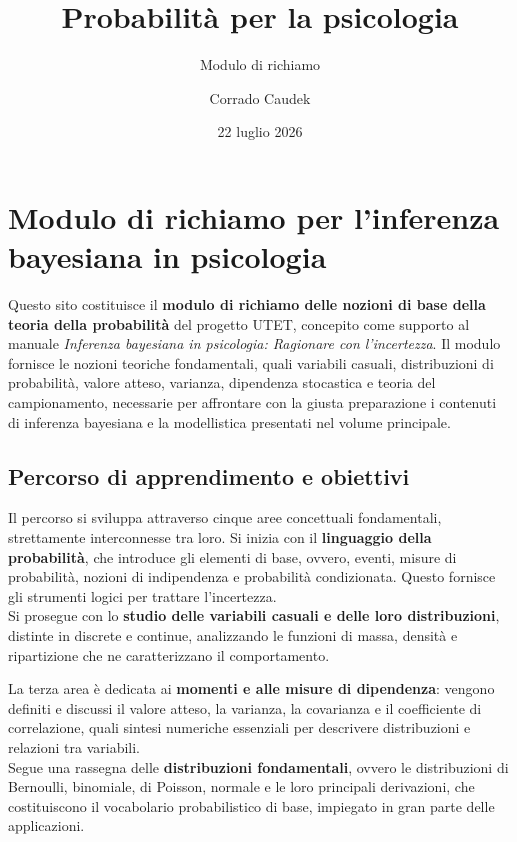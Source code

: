 \documentclass[
  italian,
  letterpaper,
  a4paper,
  11pt,
  open=any]{scrbook}
\title{Probabilità per la psicologia}
\subtitle{Modulo di richiamo}
\author{Corrado Caudek}
\date{22 luglio 2026}
\theoremstyle{plain}
\theoremstyle{definition}
\theoremstyle{definition}
\theoremstyle{remark}
\begin{document}
\frontmatter
\maketitle


\mainmatter
{}

\chapter*{Modulo di richiamo per l'inferenza bayesiana in
psicologia}\label{modulo-di-richiamo-per-linferenza-bayesiana-in-psicologia}


Questo sito costituisce il \textbf{modulo di richiamo delle nozioni di
base della teoria della probabilità} del progetto UTET, concepito come
supporto al manuale \emph{Inferenza bayesiana in psicologia: Ragionare
con l'incertezza}. Il modulo fornisce le nozioni teoriche fondamentali,
quali variabili casuali, distribuzioni di probabilità, valore atteso,
varianza, dipendenza stocastica e teoria del campionamento, necessarie
per affrontare con la giusta preparazione i contenuti di inferenza
bayesiana e la modellistica presentati nel volume principale.

\section*{Percorso di apprendimento e
obiettivi}\label{percorso-di-apprendimento-e-obiettivi}


Il percorso si sviluppa attraverso cinque aree concettuali fondamentali,
strettamente interconnesse tra loro. Si inizia con il \textbf{linguaggio
della probabilità}, che introduce gli elementi di base, ovvero, eventi,
misure di probabilità, nozioni di indipendenza e probabilità
condizionata. Questo fornisce gli strumenti logici per trattare
l'incertezza.\\
Si prosegue con lo \textbf{studio delle variabili casuali e delle loro
distribuzioni}, distinte in discrete e continue, analizzando le funzioni
di massa, densità e ripartizione che ne caratterizzano il comportamento.

La terza area è dedicata ai \textbf{momenti e alle misure di
dipendenza}: vengono definiti e discussi il valore atteso, la varianza,
la covarianza e il coefficiente di correlazione, quali sintesi numeriche
essenziali per descrivere distribuzioni e relazioni tra variabili.\\
Segue una rassegna delle \textbf{distribuzioni fondamentali}, ovvero le
distribuzioni di Bernoulli, binomiale, di Poisson, normale e le loro
principali derivazioni, che costituiscono il vocabolario probabilistico
di base, impiegato in gran parte delle applicazioni.
\end{document}
